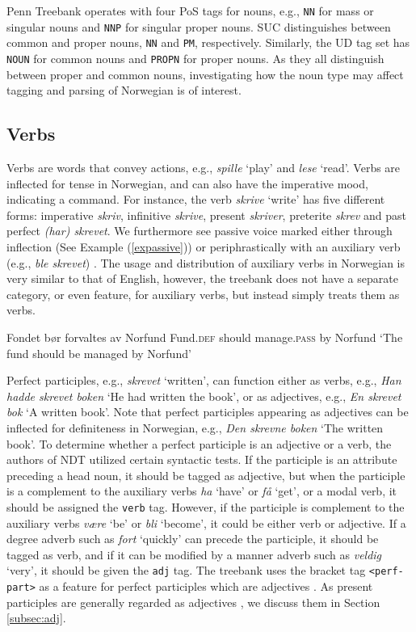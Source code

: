 \documentclass[a4paper,12pt,english]{book}
\begin{document}
Penn Treebank operates with four PoS tags for nouns, e.g., \texttt{NN} for
mass or singular nouns and \texttt{NNP} for singular proper nouns. SUC
distinguishes between common and proper nouns, \texttt{NN} and \texttt{PM},
respectively. Similarly, the UD tag set has \texttt{NOUN} for common nouns and
\texttt{PROPN} for proper nouns. As they all distinguish between proper and
common nouns, investigating how the noun type may affect tagging and parsing
of Norwegian is of interest.

\subsection{Verbs}
\label{subsec:verb}
Verbs are words that convey actions, e.g., \emph{spille} `play' and \emph{lese}
`read'. Verbs are inflected for tense in Norwegian, and can also have the
imperative mood, indicating a command. For instance, the verb \emph{skrive}
`write' has five different forms: imperative \emph{skriv}, infinitive
\emph{skrive}, present \emph{skriver}, preterite \emph{skrev} and past perfect
\emph{(har) skrevet}. We furthermore see passive voice marked either through
inflection (See Example (\ref{expassive})) or periphrastically with an auxiliary
verb (e.g., \emph{ble skrevet}) \cite{Faa:Lie:Van:97}. The usage and
distribution of auxiliary verbs in Norwegian is very similar to that of
English, however, the treebank does not have a separate category, or even
feature, for auxiliary verbs, but instead simply treats them as verbs.

\begin{examples}
\item \gll Fondet bør forvaltes av Norfund
    Fund.\textsc{def} should manage.\textsc{pass} by Norfund
    \glt `The fund should be managed by Norfund'
    \glend
    \label{expassive}
\end{examples}

Perfect participles, e.g., \emph{skrevet} `written', can function either as
verbs, e.g., \emph{Han hadde skrevet boken} `He had written the book', or as
adjectives, e.g., \emph{En skrevet bok} `A written book'. Note that perfect
participles appearing as adjectives can be inflected for definiteness in
Norwegian, e.g., \emph{Den skrevne boken} `The written book'. To determine
whether a perfect participle is an adjective or a verb, the authors of NDT
utilized certain syntactic tests. If the participle is an attribute preceding a
head noun, it should be tagged as adjective, but when the participle is a
complement to the auxiliary verbs \emph{ha} `have' or \emph{få} `get', or a
modal verb, it should be assigned the \texttt{verb} tag. However, if the
participle is complement to the auxiliary verbs \emph{være} `be' or \emph{bli}
`become', it could be either verb or adjective. If a degree adverb such as
\emph{fort} `quickly' can precede the participle, it should be tagged as verb,
and if it can be modified by a manner adverb such as \emph{veldig} `very', it
should be given the \texttt{adj} tag. The treebank uses the bracket tag
\texttt{<perf-part>} as a feature for perfect participles which are adjectives
\cite{Kin:Sol:Eri:13}. As present participles are generally regarded as
adjectives \cite{Faa:Lie:Van:97}, we discuss them in Section \ref{subsec:adj}.
\end{document}

